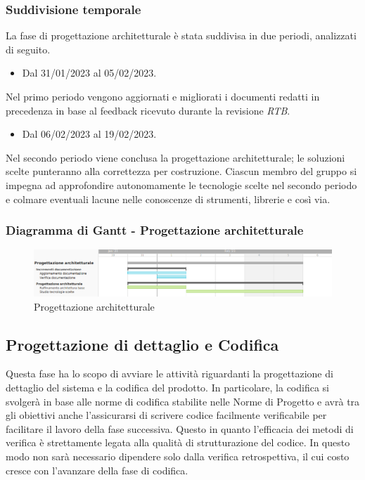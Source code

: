\subsubsection{Suddivisione temporale}
La fase di progettazione architetturale è stata suddivisa in due periodi, analizzati di seguito.

\begin{itemize}
	\item Dal 31/01/2023 al 05/02/2023.
\end{itemize}
Nel primo periodo vengono aggiornati e migliorati i documenti redatti in precedenza in base al feedback ricevuto durante la revisione \textit{RTB}.

\begin{itemize}
	\item Dal 06/02/2023 al 19/02/2023.
\end{itemize}
Nel secondo periodo viene conclusa la progettazione architetturale; le soluzioni scelte punteranno alla correttezza per costruzione. Ciascun membro del gruppo si impegna ad approfondire autonomamente le tecnologie scelte nel secondo periodo e colmare eventuali lacune nelle conoscenze di strumenti, librerie e così via.

\subsubsection{Diagramma di Gantt - Progettazione architetturale}

\begin{figure}[H]
\centering
\includegraphics[width=\textwidth]{img/4_progettazione.png}
\caption{Progettazione architetturale}
\end{figure}

\subsection{Progettazione di dettaglio e Codifica}
Questa fase ha lo scopo di avviare le attività riguardanti la progettazione di dettaglio del sistema e la codifica del prodotto.
In particolare, la codifica si svolgerà in base alle norme di codifica stabilite nelle Norme di Progetto e avrà tra gli obiettivi anche l’assicurarsi di scrivere codice facilmente verificabile per facilitare il lavoro della fase successiva. Questo in quanto l'efficacia dei metodi di verifica è strettamente legata alla qualità di strutturazione del codice. In questo modo non sarà necessario dipendere solo dalla verifica retrospettiva, il cui costo cresce con l'avanzare della fase di codifica.

